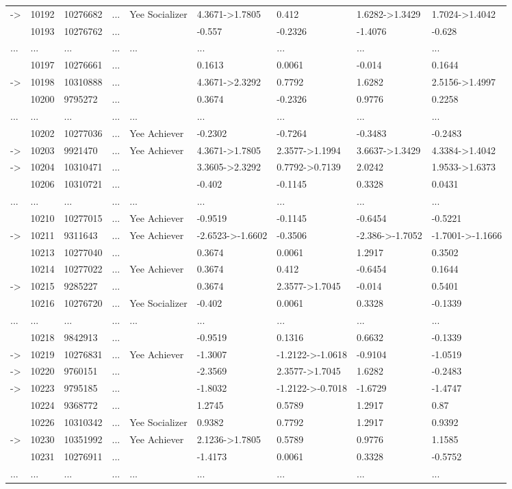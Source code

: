 \documentclass[6pt,a4paper]{article}
\begin{document}
\begin{landscape}
{\begin{longtable}{lllllllll}
-\textgreater &10192&10276682&...&Yee Socializer&4.3671-\textgreater 1.7805&0.412&1.6282-\textgreater 1.3429&1.7024-\textgreater 1.4042\tabularnewline
&10193&10276762&...&&-0.557&-0.2326&-1.4076&-0.628\tabularnewline
...&...&...&...&...&...&...&...&...\tabularnewline
&10197&10276661&...&&0.1613&0.0061&-0.014&0.1644\tabularnewline
-\textgreater &10198&10310888&...&&4.3671-\textgreater 2.3292&0.7792&1.6282&2.5156-\textgreater 1.4997\tabularnewline
&10200&9795272&...&&0.3674&-0.2326&0.9776&0.2258\tabularnewline
...&...&...&...&...&...&...&...&...\tabularnewline
&10202&10277036&...&Yee Achiever&-0.2302&-0.7264&-0.3483&-0.2483\tabularnewline
-\textgreater &10203&9921470&...&Yee Achiever&4.3671-\textgreater 1.7805&2.3577-\textgreater 1.1994&3.6637-\textgreater 1.3429&4.3384-\textgreater 1.4042\tabularnewline
-\textgreater &10204&10310471&...&&3.3605-\textgreater 2.3292&0.7792-\textgreater 0.7139&2.0242&1.9533-\textgreater 1.6373\tabularnewline
&10206&10310721&...&&-0.402&-0.1145&0.3328&0.0431\tabularnewline
...&...&...&...&...&...&...&...&...\tabularnewline
&10210&10277015&...&Yee Achiever&-0.9519&-0.1145&-0.6454&-0.5221\tabularnewline
-\textgreater &10211&9311643&...&Yee Achiever&-2.6523-\textgreater -1.6602&-0.3506&-2.386-\textgreater -1.7052&-1.7001-\textgreater -1.1666\tabularnewline
&10213&10277040&...&&0.3674&0.0061&1.2917&0.3502\tabularnewline
&10214&10277022&...&Yee Achiever&0.3674&0.412&-0.6454&0.1644\tabularnewline
-\textgreater &10215&9285227&...&&0.3674&2.3577-\textgreater 1.7045&-0.014&0.5401\tabularnewline
&10216&10276720&...&Yee Socializer&-0.402&0.0061&0.3328&-0.1339\tabularnewline
...&...&...&...&...&...&...&...&...\tabularnewline
&10218&9842913&...&&-0.9519&0.1316&0.6632&-0.1339\tabularnewline
-\textgreater &10219&10276831&...&Yee Achiever&-1.3007&-1.2122-\textgreater -1.0618&-0.9104&-1.0519\tabularnewline
-\textgreater &10220&9760151&...&&-2.3569&2.3577-\textgreater 1.7045&1.6282&-0.2483\tabularnewline
-\textgreater &10223&9795185&...&&-1.8032&-1.2122-\textgreater -0.7018&-1.6729&-1.4747\tabularnewline
&10224&9368772&...&&1.2745&0.5789&1.2917&0.87\tabularnewline
&10226&10310342&...&Yee Socializer&0.9382&0.7792&1.2917&0.9392\tabularnewline
-\textgreater &10230&10351992&...&Yee Achiever&2.1236-\textgreater 1.7805&0.5789&0.9776&1.1585\tabularnewline
&10231&10276911&...&&-1.4173&0.0061&0.3328&-0.5752\tabularnewline
\newpage
...&...&...&...&...&...&...&...&...\tabularnewline
\hline
\end{longtable}}

\end{landscape}
\end{document}
